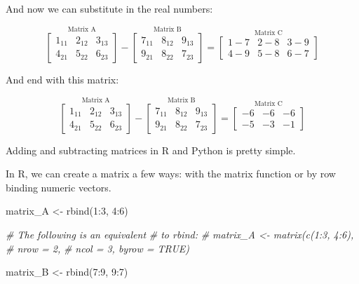 \documentclass[
  letterpaper,
]{krantz}
\newenvironment{Shaded}{}{}
\newcommand{\CommentTok}[1]{\textcolor[rgb]{0.38,0.63,0.69}{\textit{#1}}}
\newcommand{\DecValTok}[1]{\textcolor[rgb]{0.25,0.63,0.44}{#1}}
\newcommand{\FunctionTok}[1]{\textcolor[rgb]{0.02,0.16,0.49}{#1}}
\newcommand{\NormalTok}[1]{#1}
\newcommand{\OtherTok}[1]{\textcolor[rgb]{0.00,0.44,0.13}{#1}}
\newcommand{\SpecialCharTok}[1]{\textcolor[rgb]{0.25,0.44,0.63}{#1}}
\begin{document}
And now we can substitute in the real numbers:

\[
\stackrel{\mbox{Matrix A}}{
\begin{bmatrix}
1_{11} & 2_{12} & 3_{13}\\
4_{21} & 5_{22} & 6_{23}
\end{bmatrix}
}
-
\stackrel{\mbox{Matrix B}}{
\begin{bmatrix}
7_{11} & 8_{12} & 9_{13}\\
9_{21} & 8_{22} & 7_{23}
\end{bmatrix} 
}
=
\stackrel{\mbox{Matrix C}}{
\begin{bmatrix}
1 - 7 & 2 - 8 & 3 - 9\\
4 - 9 & 5 - 8 & 6 - 7
\end{bmatrix}
}
\]

And end with this matrix:

\[
\stackrel{\mbox{Matrix A}}{
\begin{bmatrix}
1_{11} & 2_{12} & 3_{13}\\
4_{21} & 5_{22} & 6_{23}
\end{bmatrix}
}
-
\stackrel{\mbox{Matrix B}}{
\begin{bmatrix}
7_{11} & 8_{12} & 9_{13}\\
9_{21} & 8_{22} & 7_{23}
\end{bmatrix} 
}
=
\stackrel{\mbox{Matrix C}}{
\begin{bmatrix}
-6 & -6 & -6 \\
-5 & -3 & -1
\end{bmatrix}
}
\]

Adding and subtracting matrices in R and Python is pretty simple.

In R, we can create a matrix a few ways: with the matrix function or by
row binding numeric vectors.

\begin{Shaded}
\begin{Highlighting}[]
\NormalTok{matrix\_A }\OtherTok{\textless{}{-}} \FunctionTok{rbind}\NormalTok{(}\DecValTok{1}\SpecialCharTok{:}\DecValTok{3}\NormalTok{, }
                  \DecValTok{4}\SpecialCharTok{:}\DecValTok{6}\NormalTok{)}

\CommentTok{\# The following is an equivalent}
\CommentTok{\# to rbind:}
\CommentTok{\# matrix\_A \textless{}{-} matrix(c(1:3, 4:6), }
\CommentTok{\#                    nrow = 2, }
\CommentTok{\#                    ncol = 3, byrow = TRUE)}

\NormalTok{matrix\_B }\OtherTok{\textless{}{-}} \FunctionTok{rbind}\NormalTok{(}\DecValTok{7}\SpecialCharTok{:}\DecValTok{9}\NormalTok{, }
                  \DecValTok{9}\SpecialCharTok{:}\DecValTok{7}\NormalTok{)}
\end{Highlighting}
\end{Shaded}
\end{document}
